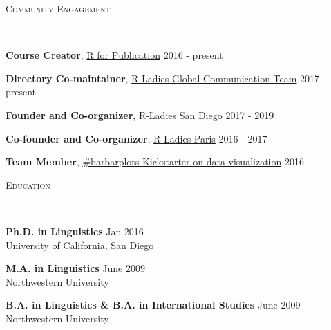 \documentclass[9pt]{article}
\newenvironment{changemargin}[2]{%
  \begin{list}{}{%
    \setlength{\topsep}{0pt}%
    \setlength{\leftmargin}{#1}%
    \setlength{\rightmargin}{#2}%
    \setlength{\listparindent}{\parindent}%
    \setlength{\itemindent}{\parindent}%
    \setlength{\parsep}{\parskip}%
  }%
  \item[]}{\end{list}
}
\newcommand{\lineover}{
	\begin{changemargin}{-0.05in}{-0.05in}
		\vspace*{-8pt}
		\hrulefill \\
		\vspace*{-2pt}
	\end{changemargin}
}
\newcommand{\header}[1]{
	\begin{changemargin}{-0.5in}{-0.5in}
		\scshape{#1}\\
  	\lineover
	\end{changemargin}
}
\newenvironment{body} {
	\vspace*{-16pt}
	\begin{changemargin}{-0.25in}{-0.5in}
  }	
	{\end{changemargin}
}
\begin{document}
\smallskip


\header{\color{red}Community Engagement}

\begin{body}
	\vspace{14pt}
	
	\textbf{Course Creator}, \href{https://pagepiccinini.com/r-course/}{\color{red}R for Publication} \hfill 2016 - present\\
	\medskip

	\textbf{Directory Co-maintainer}, \href{https://rladies.org/about-us/team/}{\color{red}R-Ladies Global Communication Team} \hfill 2017 - present\\
	\medskip
	
	\textbf{Founder and Co-organizer}, \href{https://www.meetup.com/rladies-san-diego/}{\color{red}R-Ladies San Diego} \hfill 2017 - 2019\\
	\medskip	

	\textbf{Co-founder and Co-organizer}, \href{https://www.meetup.com/rladies-paris/}{\color{red}R-Ladies Paris} \hfill 2016 - 2017\\
	\medskip

	\textbf{Team Member}, \href{https://barbarplots.github.io/}{\color{red}\#barbarplots Kickstarter on data visualization} \hfill 2016\\
	\medskip
		
\end{body}

\smallskip


\header{\color{red}Education}

\begin{body}
	\vspace{14pt}
	
	\textbf{Ph.D. in Linguistics} \hfill Jan 2016\\
	University of California, San Diego\\
 	\medskip
	\medskip

	\textbf{M.A. in Linguistics} \hfill June 2009\\
	Northwestern University
 	\medskip
	\medskip

	\textbf{B.A. in Linguistics \& B.A. in International Studies} \hfill June 2009\\
	Northwestern University\\
	\medskip
	\medskip

\end{body}
\end{document}
